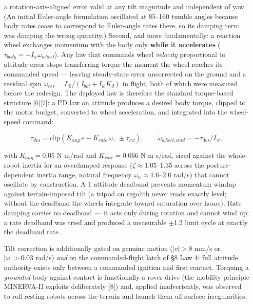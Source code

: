 \documentclass[conference]{IEEEtran}
\begin{document}
a rotation-axis-aligned error valid at any tilt magnitude and independent of yaw. (An initial Euler-angle formulation oscillated at 85--160\textdegree{} tumble angles because body rates cease to correspond to Euler-angle rates there, so its damping term was damping the wrong quantity.) Second, and more fundamentally: a reaction wheel exchanges momentum with the body only \textbf{while it accelerates} ($\tau_{body} = -I_w\dot{\omega}_{wheel}$). Any law that commands wheel \emph{velocity} proportional to attitude error stops transferring torque the moment the wheel reaches its commanded speed --- leaving steady-state error uncorrected on the ground and a residual spin $\omega_{res} = L_0/(I_{bot} + I_wK_d)$ in flight, both of which were measured before the redesign. The deployed law is therefore the standard torque-based structure [6][7]: a PD law on attitude produces a desired body torque, clipped to the motor budget, converted to wheel acceleration, and integrated into the wheel-speed command:

\begin{equation*}\tau_{des} = \mathrm{clip}\!\left(K_{ang}\,e - K_{rate}\,\omega,\ \pm\tau_{rw}\right), \qquad \dot{\omega}_{wheel,cmd} = -\tau_{des}/I_w,\end{equation*}

with $K_{ang} = 0.05$ N\,\textperiodcentered\,m/rad and $K_{rate} = 0.066$ N\,\textperiodcentered\,m\,\textperiodcentered\,s/rad, sized against the whole-robot inertia for an overdamped response ($\zeta \approx 1.05$--$1.35$ across the posture-dependent inertia range, natural frequency $\omega_n \approx 1.6$--$2.0$ rad/s) that cannot oscillate by construction. A 1\textdegree{} attitude deadband prevents momentum windup against terrain-imposed tilt (a tripod on regolith never reads exactly level; without the deadband the wheels integrate toward saturation over hours). Rate damping carries no deadband --- it acts only during rotation and cannot wind up; a rate deadband was tried and produced a measurable \ensuremath{\pm}1.2\textdegree{} limit cycle at exactly the deadband rate.

Tilt correction is additionally gated on genuine motion ($|v| > 8$ mm/s or $|\omega| > 0.03$ rad/s) \emph{and} on the commanded-flight latch of \S8 Law 4: full attitude authority exists only between a commanded ignition and first contact. Torquing a \emph{grounded} body against contact is functionally a rover drive (the mobility principle MINERVA-II exploits deliberately [8]) and, applied inadvertently, was observed to roll resting robots across the terrain and launch them off surface irregularities.
\end{document}

